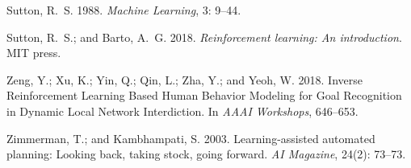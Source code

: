 \documentclass[letterpaper]{article} %
\begin{document}
\begin{thebibliography}{30}
Sutton, R.~S. 1988.
\newblock \emph{Machine Learning}, 3: 9--44.

Sutton, R.~S.; and Barto, A.~G. 2018.
\newblock \emph{Reinforcement learning: An introduction}.
\newblock MIT press.

Zeng, Y.; Xu, K.; Yin, Q.; Qin, L.; Zha, Y.; and Yeoh, W. 2018.
\newblock Inverse Reinforcement Learning Based Human Behavior Modeling for Goal
  Recognition in Dynamic Local Network Interdiction.
\newblock In \emph{AAAI Workshops}, 646--653.

Zimmerman, T.; and Kambhampati, S. 2003.
\newblock Learning-assisted automated planning: Looking back, taking stock,
  going forward.
\newblock \emph{AI Magazine}, 24(2): 73--73.

\end{thebibliography}
\end{document}
